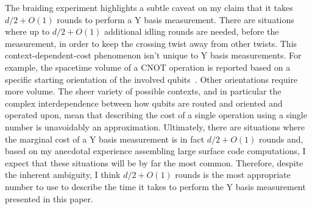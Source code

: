 \documentclass[onecolumn,unpublished,a4paper]{quantumarticle}
\theoremstyle{definition}
\theoremstyle{definition}
\theoremstyle{definition}
\begin{document}
The braiding experiment highlights a subtle caveat on my claim that it takes $d/2 + O(1)$ rounds to perform a Y basis measurement.
There are situations where up to $d/2 + O(1)$ additional idling rounds are needed, before the measurement, in order to keep the crossing twist away from other twists.
This context-dependent-cost phenomenon isn't unique to Y basis measurements.
For example, the spacetime volume of a CNOT operation is reported based on a specific starting orientation of the involved qubits~\cite{horsman2012latticesurgery}.
Other orientations require more volume.
The sheer variety of possible contexts, and in particular the complex interdependence between how qubits are routed and oriented and operated upon, mean that describing the cost of a single operation using a single number is unavoidably an approximation.
Ultimately, there are situations where the marginal cost of a Y basis measurement is in fact $d/2 + O(1)$ rounds and, based on my anecdotal experience assembling large surface code computations, I expect that these situations will be by far the most common.
Therefore, despite the inherent ambiguity, I think $d/2 + O(1)$ rounds is the most appropriate number to use to describe the time it takes to perform the Y basis measurement presented in this paper.
\end{document}
